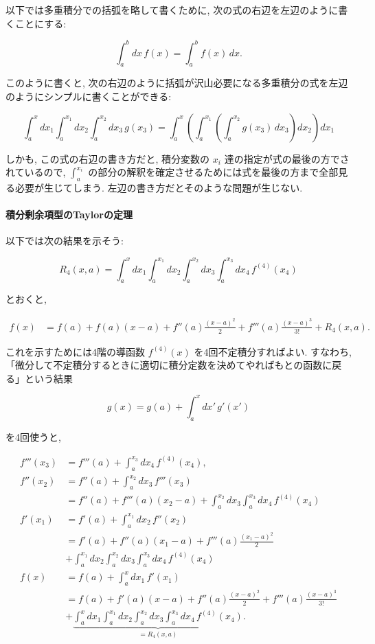 \documentclass[
  letterpaper,
  DIV=11,
  numbers=noendperiod]{scrartcl}
\let\oldparagraph\paragraph
\renewcommand{\paragraph}[1]{\oldparagraph{#1}\mbox{}}
\begin{document}
以下では多重積分での括弧を略して書くために,
次の式の右辺を左辺のように書くことにする:

\[
\int_a^b dx\,f(x) = \int_a^b f(x)\,dx.
\]

このように書くと,
次の右辺のように括弧が沢山必要になる多重積分の式を左辺のようにシンプルに書くことができる:

\[
\int_a^x dx_1\int_a^{x_1}dx_2\int_a^{x_2}dx_3\,g(x_3) =
\int_a^x\left(\int_a^{x_1}\left(\int_a^{x_2}g(x_3)\,dx_3\right)dx_2\right)dx_1
\]

しかも, この式の右辺の書き方だと, 積分変数の \(x_i\)
達の指定が式の最後の方でされているので, \(\int_a^{x_i}\)
の部分の解釈を確定させるためには式を最後の方まで全部見る必要が生じてしまう.
左辺の書き方だとそのような問題が生じない.

\hypertarget{ux7a4dux5206ux5270ux4f59ux9805ux578bux306etaylorux306eux5b9aux7406}{%
\paragraph{積分剰余項型のTaylorの定理}\label{ux7a4dux5206ux5270ux4f59ux9805ux578bux306etaylorux306eux5b9aux7406}}

以下では次の結果を示そう:

\[
R_4(x, a) = \int_a^x dx_1\int_a^{x_1}dx_2\int_a^{x_2}dx_3\int_a^{x_3}dx_4\, f^{(4)}(x_4)
\]

とおくと,

\[
\begin{aligned}
f(x) &= f(a) + f(a)(x-a) + f''(a)\frac{(x-a)^2}{2} + f'''(a)\frac{(x-a)^3}{3!} + R_4(x,a).
\end{aligned}
\]

これを示すためには4階の導函数 \(f^{(4)}(x)\) を4回不定積分すればよい.
すなわち,
「微分して不定積分するときに適切に積分定数を決めてやればもとの函数に戻る」という結果

\[
g(x) = g(a) + \int_a^x dx'\,g'(x') 
\]

を4回使うと,

\[
\begin{aligned}
f'''(x_3) &= f'''(a) + \int_a^{x_3}dx_4\,f^{(4)}(x_4),
\\
f''(x_2) &= f''(a) + \int_a^{x_2}dx_3\,f'''(x_3)
\\ &=
f''(a) + f'''(a)(x_2 - a) + \int_a^{x_2}dx_3\int_a^{x_3}dx_4\,f^{(4)}(x_4)
\\
f'(x_1) &= f'(a) + \int_a^{x_1}dx_2\,f''(x_2)
\\ &=
f'(a) + f''(a)(x_1 - a) + f'''(a)\frac{(x_1 - a)^2}{2}
\\ &+
\int_a^{x_1}dx_2\int_a^{x_2}dx_3\int_a^{x_3}dx_4\,f^{(4)}(x_4)
\\
f(x) &= f(a) + \int_a^{x}dx_1\,f'(x_1)
\\ &=
f(a) + f'(a)(x - a) + f''(a)\frac{(x - a)^2}{2} + f'''(a)\frac{(x - a)^3}{3!}
\\ &+
\underbrace{
\int_a^{x}dx_1\int_a^{x_1}dx_2\int_a^{x_2}dx_3\int_a^{x_3}dx_4\,f^{(4)}(x_4)
}_{=R_4(x,a)}.
\end{aligned}
\]
\end{document}
